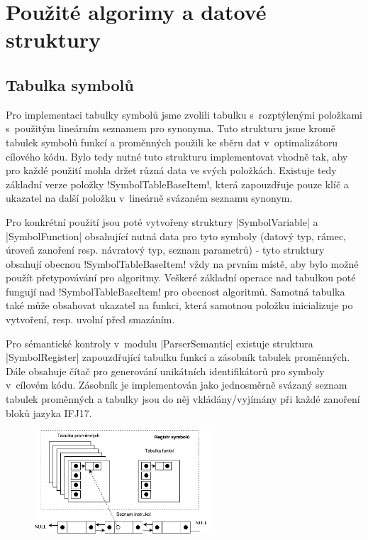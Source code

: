 \section{Použité algorimy a datové struktury}

\subsection{Tabulka symbolů}
Pro implementaci tabulky symbolů jsme zvolili tabulku s~rozptýlenými položkami s~použitým lineárním seznamem pro synonyma.
Tuto strukturu jsme kromě tabulek symbolů funkcí a proměnných použili ke sběru dat v~optimalizátoru cílového kódu. Bylo tedy nutné tuto strukturu implementovat vhodně tak, aby pro každé použití mohla držet různá data ve svých položkách. Existuje tedy základní verze položky \ic!SymbolTableBaseItem!, která zapouzdřuje pouze klíč a ukazatel na další položku v~lineárně svázaném seznamu synonym.

Pro konkrétní použití jsou poté vytvořeny struktury \ic|SymbolVariable| a \ic|SymbolFunction| obsahující nutná data pro tyto symboly (datový typ, rámec, úroveň zanoření resp. návratový typ, seznam parametrů) - tyto struktury obsahují obecnou \ic!SymbolTableBaseItem! vždy na prvním místě, aby bylo možné použít přetypovávání pro algoritmy. Veškeré základní operace nad tabulkou poté fungují nad \ic!SymbolTableBaseItem! pro obecnost algoritmů. Samotná tabulka také může obsahovat ukazatel na funkci, která samotnou položku inicializuje po vytvoření, resp. uvolní před smazáním.

Pro sémantické kontroly v~modulu \ic|ParserSemantic| existuje struktura \ic|SymbolRegister| zapouzdřující tabulku funkcí a zásobník tabulek proměnných. Dále obsahuje čítač pro generování unikátních identifikátorů pro symboly v~cílovém kódu. Zásobník je implementován jako jednosměrně svázaný seznam tabulek proměnných a tabulky jsou do něj vkládány/vyjímány při každé zanoření bloků jazyka IFJ17.

\begin{figure}[htbp]
    \centering
    \includegraphics[width=0.6\textwidth, angle=0]{src/assets/symbol_table.pdf}
\end{figure}

